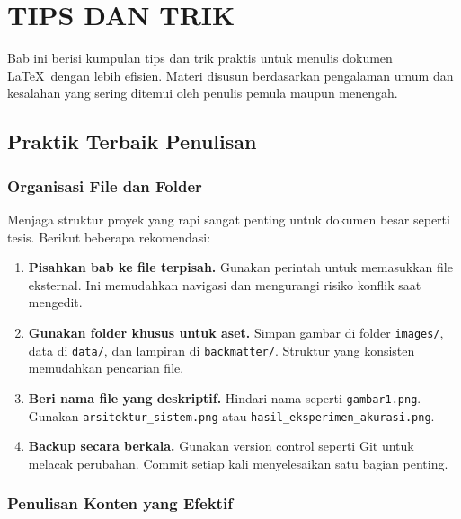 \chapter{TIPS DAN TRIK}

Bab ini berisi kumpulan tips dan trik praktis untuk menulis dokumen \LaTeX\ dengan lebih efisien. Materi disusun berdasarkan pengalaman umum dan kesalahan yang sering ditemui oleh penulis pemula maupun menengah.

\section{Praktik Terbaik Penulisan}

\subsection{Organisasi File dan Folder}

Menjaga struktur proyek yang rapi sangat penting untuk dokumen besar seperti tesis. Berikut beberapa rekomendasi:

\begin{enumerate}
  \item \textbf{Pisahkan bab ke file terpisah.} Gunakan perintah \verb|| untuk memasukkan file eksternal. Ini memudahkan navigasi dan mengurangi risiko konflik saat mengedit.

  \item \textbf{Gunakan folder khusus untuk aset.} Simpan gambar di folder \texttt{images/}, data di \texttt{data/}, dan lampiran di \texttt{backmatter/}. Struktur yang konsisten memudahkan pencarian file.

  \item \textbf{Beri nama file yang deskriptif.} Hindari nama seperti \texttt{gambar1.png}. Gunakan \texttt{arsitektur\_sistem.png} atau \texttt{hasil\_eksperimen\_akurasi.png}.

  \item \textbf{Backup secara berkala.} Gunakan version control seperti Git untuk melacak perubahan. Commit setiap kali menyelesaikan satu bagian penting.
\end{enumerate}

\subsection{Penulisan Konten yang Efektif}


